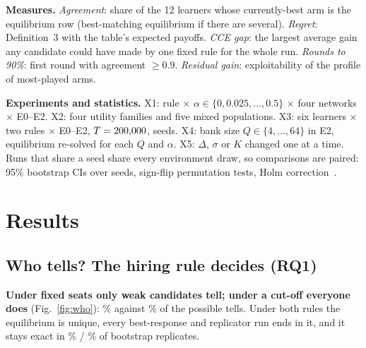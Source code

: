 \documentclass[conference]{IEEEtran}
\theoremstyle{plain}
\theoremstyle{definition}\newtheorem{definition}{Definition}
\newcommand{\finding}[1]{\textbf{#1}}
\begin{document}
\textbf{Measures.} \emph{Agreement}: share of the 12 learners whose currently-best arm is the equilibrium row (best-matching equilibrium if there are several). \emph{Regret}: Definition~3 with the table's expected payoffs.
\emph{CCE gap}: the largest average gain any candidate could have made by one fixed rule for the whole run. \emph{Rounds to 90\%}: first round with agreement $\ge0.9$. \emph{Residual gain}: exploitability of the profile of most-played arms.

\textbf{Experiments and statistics.} X1: rule $\times$ $\alpha\in\{0,0.025,\dots,0.5\}$ $\times$ four networks $\times$ E0--E2. X2: four utility families and five mixed populations.
X3: six learners $\times$ two rules $\times$ E0--E2, $T=200{,}000$, \XthreeSeeds{} seeds. X4: bank size $Q\in\{4,\dots,64\}$ in E2, equilibrium re-solved for each $Q$ and $\alpha$. X5: $\Delta$, $\sigma$ or $K$ changed one at a time.
Runs that share a seed share every environment draw, so comparisons are paired: 95\% bootstrap CIs over seeds, sign-flip permutation tests, Holm correction~\cite{holm}.

\section{Results}\label{sec:results}

\subsection{Who tells? The hiring rule decides (RQ1)}\label{sec:who}
\begin{table}[t]\centering\small
\caption{Equilibrium sharing for different motives (two friend groups A$=\{1,3,5\}$, B$=\{2,4,6\}$; E1). Every game has exactly one pure equilibrium.
$^\dagger$: exact equilibrium in fewer than 95\% of bootstrap replicates.}\label{tab:x2}
\resizebox{0.74\textwidth}{!}{}
\end{table}
\finding{Under fixed seats only weak candidates tell; under a cut-off everyone does} (Fig.~\ref{fig:who}): \PilotShareSeats\% against \PilotShareBar\% of the possible tells.
Under both rules the equilibrium is unique, every best-response and replicator run ends in it, and it stays exact in \PilotBootFracSeats\% / \PilotBootFracBar\% of \PilotBootRSeats{} bootstrap replicates.
\end{document}
